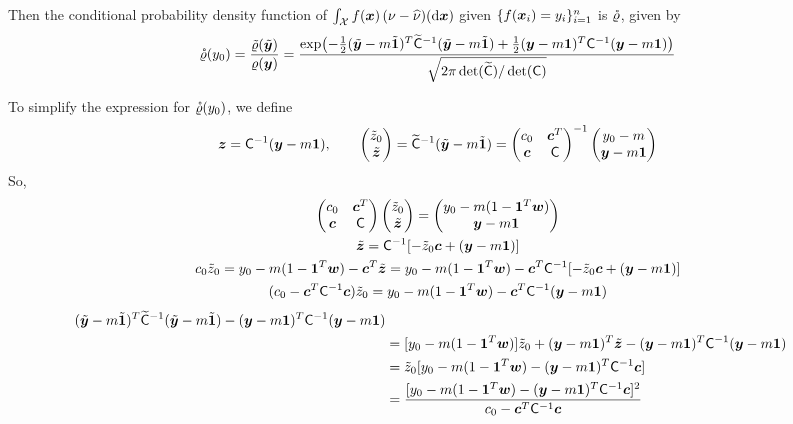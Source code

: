 \documentclass[graybox,footinfo]{svmult}
\begin{document}
Then the conditional probability density function of $\int_{\cx} f(\bsx) \,  (\nu -\hnu)(\D \bsx)$ given $\{f(\bsx_i )= y_i\}_{i=1}^n$ is $\rvarrho$, given by
\begin{equation*}
\rvarrho(y_0)  = \frac{\tvarrho(\tbsy)}{\varrho(\bsy)}  = \frac{\exp\bigl(-\frac 12 (\tbsy - m \tbsone)^T \tmC^{-1} (\tbsy - m \tbsone) + \frac 12 (\bsy - m \bsone)^T \mC^{-1} (\bsy - m \bsone)\bigr)}{\sqrt{2 \pi \det(\tmC)/\det(\mC)}}
\end{equation*}

To simplify the expression for $\rvarrho(y_0)$, we define
\[
\bsz = \mC^{-1} (\bsy - m \bsone), \qquad 
\begin{pmatrix} \tz_0 \\ \tbsz \end{pmatrix} = \tmC^{-1} (\tbsy - m \tbsone) 
= \begin{pmatrix} c_0 & \bsc^T \\ \bsc & \mC \end{pmatrix}^{-1} \begin{pmatrix} y_0 - m \\ \bsy - m \bsone \end{pmatrix}
\]
So,
\begin{gather*}
\begin{pmatrix} c_0 & \bsc^T \\ \bsc & \mC \end{pmatrix} \begin{pmatrix} \tz_0 \\ \tbsz \end{pmatrix} 
= \begin{pmatrix} y_0 - m(1 - \bsone^T\bsw) \\ \bsy - m \bsone \end{pmatrix} \\
\tbsz = \mC^{-1}[-\tz_0 \bsc + (\bsy - m \bsone )] \\
c_0 \tz_0 =y_0 - m(1 - \bsone^T\bsw)  - \bsc^T\tbsz =  y_0 - m(1 - \bsone^T\bsw)  - \bsc^T\mC^{-1}[-\tz_0 \bsc + (\bsy - m \bsone )] \\
(c_0 - \bsc^T\mC^{-1} \bsc) \tz_0 = y_0 - m(1 - \bsone^T\bsw)  - \bsc^T\mC^{-1}(\bsy - m \bsone )
\end{gather*}
\begin{align*}
(\tbsy - m \tbsone)^T \tmC^{-1} (\tbsy - m \tbsone) - (\bsy - m \bsone)^T \mC^{-1} (\bsy - 
m \bsone) \\
& = [y_0 - m(1 - \bsone^T\bsw)] \tz_0 + (\bsy - m \bsone)^T \tbsz - (\bsy - m \bsone)^T \mC^{-1} (\bsy - m \bsone) \\
& = \tz_0 [y_0 - m(1 - \bsone^T\bsw)  -  (\bsy - m \bsone)^T \mC^{-1} \bsc ] \\
& = \frac{[y_0 - m(1 - \bsone^T\bsw)  -  (\bsy - m \bsone)^T \mC^{-1} \bsc ]^2}{c_0 - \bsc^T\mC^{-1} \bsc}
\end{align*}
\end{document}

